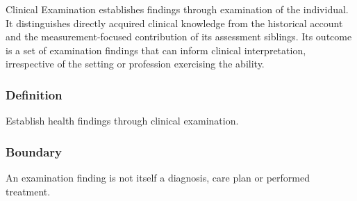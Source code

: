 Clinical Examination establishes findings through examination of the individual. It distinguishes directly acquired clinical knowledge from the historical account and the measurement-focused contribution of its assessment siblings. Its outcome is a set of examination findings that can inform clinical interpretation, irrespective of the setting or profession exercising the ability.

\subsubsection*{Definition}

Establish health findings through clinical examination.

\subsubsection*{Boundary}

An examination finding is not itself a diagnosis, care plan or performed treatment.


